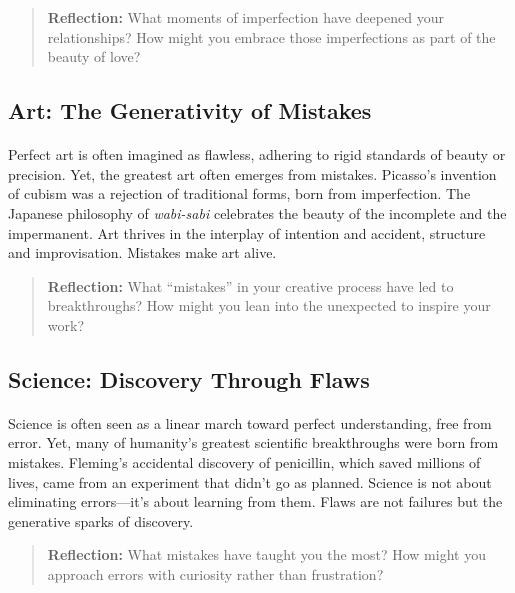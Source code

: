 \documentclass[12pt]{article}
\begin{document}
\begin{quote}
\textbf{Reflection:}  
What moments of imperfection have deepened your relationships? How might you embrace those imperfections as part of the beauty of love?
\end{quote}

\subsection{Art: The Generativity of Mistakes}
\paragraph{}
Perfect art is often imagined as flawless, adhering to rigid standards of beauty or precision. Yet, the greatest art often emerges from mistakes. Picasso’s invention of cubism was a rejection of traditional forms, born from imperfection. The Japanese philosophy of \textit{wabi-sabi} celebrates the beauty of the incomplete and the impermanent. Art thrives in the interplay of intention and accident, structure and improvisation. Mistakes make art alive.

\begin{quote}
\textbf{Reflection:}  
What “mistakes” in your creative process have led to breakthroughs? How might you lean into the unexpected to inspire your work?
\end{quote}

\subsection{Science: Discovery Through Flaws}
\paragraph{}
Science is often seen as a linear march toward perfect understanding, free from error. Yet, many of humanity’s greatest scientific breakthroughs were born from mistakes. Fleming’s accidental discovery of penicillin, which saved millions of lives, came from an experiment that didn’t go as planned. Science is not about eliminating errors—it’s about learning from them. Flaws are not failures but the generative sparks of discovery.

\begin{quote}
\textbf{Reflection:}  
What mistakes have taught you the most? How might you approach errors with curiosity rather than frustration?
\end{quote}
\end{document}
